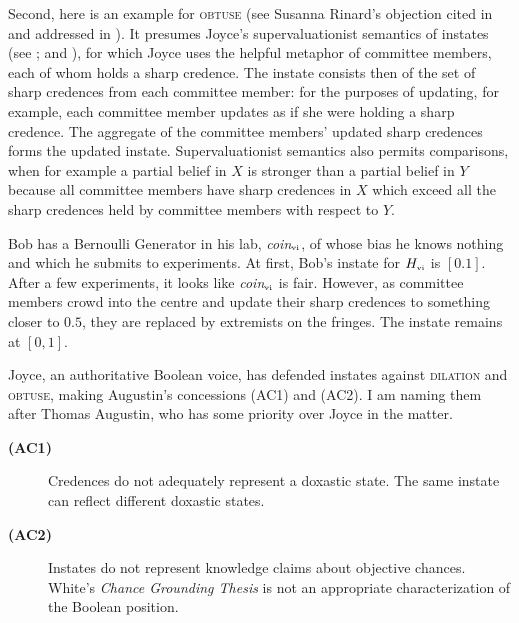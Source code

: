 \documentclass[11pt]{article}
\begin{document}
Second, here is an example for \textsc{obtuse} (see Susanna Rinard's
objection cited in  and addressed in
). It presumes Joyce's supervaluationist
semantics of instates (see ; and
), for which Joyce uses the helpful metaphor of
committee members, each of whom holds a sharp credence. The instate
consists then of the set of sharp credences from each committee
member: for the purposes of updating, for example, each committee
member updates as if she were holding a sharp credence. The aggregate
of the committee members' updated sharp credences forms the updated
instate. Supervaluationist semantics also permits comparisons, when
for example a partial belief in $X$ is stronger than a partial belief
in $Y$ because all committee members have sharp credences in $X$ which
exceed all the sharp credences held by committee members with respect
to $Y$.

\begin{quotex}
  \label{ex:obtuse} Bob has a Bernoulli
  Generator in his lab, \textit{coin}$_{\mbox{\tiny{vi}}}$, of whose
  bias he knows nothing and which he submits to experiments. At first,
  Bob's instate for $H_{\mbox{\tiny{vi}}}$ is $[0.1]$. After a few
  experiments, it looks like \textit{coin}$_{\mbox{\tiny{vi}}}$ is
  fair. However, as committee members crowd into the centre and update
  their sharp credences to something closer to $0.5$, they are
  replaced by extremists on the fringes. The instate remains at
  $[0,1]$. 
\end{quotex}

Joyce, an authoritative Boolean voice, has defended instates against
\textsc{dilation} and \textsc{obtuse}, making Augustin's concessions
(AC1) and (AC2). I am naming them after Thomas Augustin, who has some
priority over Joyce in the matter.

\begin{description}
\item[{\bf (AC1)}] Credences do not adequately represent a doxastic
  state. The same instate can reflect different doxastic states.
\item[{\bf (AC2)}] Instates do not represent knowledge claims about
  objective chances. White's \emph{Chance Grounding Thesis} is not an
  appropriate characterization of the Boolean position.
\end{description}
\end{document}
